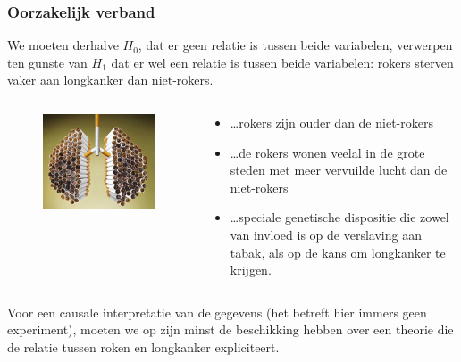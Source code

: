 \documentclass{beamer}
\begin{document}
\begin{frame}
  \frametitle{Oorzakelijk verband}
  We moeten derhalve $H_{0}$, dat er geen relatie is tussen beide variabelen, verwerpen ten gunste van $H_{1}$ dat er wel een relatie is tussen beide variabelen: rokers sterven vaker aan longkanker dan niet-rokers.
  \begin{columns}
  \begin{column}{0.3 \textwidth}

  \begin{figure}
    \centering
      \includegraphics[width=1.00\textwidth]{img/les-6-smoking2.jpg}
  \end{figure}

  \end{column}
  \begin{column}{0.7 \textwidth}

  \begin{itemize}
    \item  \dots rokers zijn ouder dan de niet-rokers
    \item \dots de rokers wonen veelal in de grote steden met
meer vervuilde lucht dan de niet-rokers
    \item \dots speciale genetische dispositie die zowel van invloed is op de verslaving aan tabak, als op de kans om longkanker te krijgen.
  \end{itemize}
  \end{column}
\end{columns}
Voor een causale interpretatie van de gegevens (het betreft hier immers geen experiment), moeten we op zijn minst de beschikking hebben over een theorie die de relatie tussen roken en longkanker expliciteert.

\end{frame}
\end{document}
